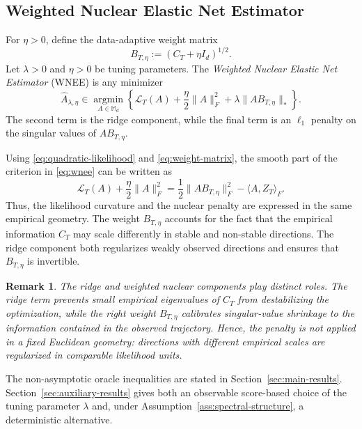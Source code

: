 \documentclass[11pt]{article}
\newtheorem{remark}[theorem]{Remark}
\begin{document}
\subsection{Weighted Nuclear Elastic Net Estimator}
\label{subsec:wnee}

For $\eta>0$, define the data-adaptive weight matrix
\begin{equation}
    B_{T,\eta}:=(C_T+\eta I_d)^{1/2}.
\label{eq:weight-matrix}
\end{equation}
Let $\lambda>0$ and $\eta>0$ be tuning parameters. The \emph{Weighted Nuclear
Elastic Net Estimator} (WNEE) is any minimizer
\begin{equation}
    \widehat A_{\lambda,\eta}
    \in\underset{A\in\mathbb M_d}{\operatorname{argmin}}
    \left\{
        \mathcal L_T(A)
        +\frac{\eta}{2}\|A\|_F^2
        +\lambda\big\|AB_{T,\eta}\big\|_*
    \right\}.
\label{eq:wnee}
\end{equation}
The second term is the ridge component, while the final term is an $\ell_1$
penalty on the singular values of $AB_{T,\eta}$.

Using \eqref{eq:quadratic-likelihood} and \eqref{eq:weight-matrix}, the smooth
part of the criterion in \eqref{eq:wnee} can be written as
\begin{equation}
    \mathcal L_T(A)+\frac{\eta}{2}\|A\|_F^2
    =\frac12\|AB_{T,\eta}\|_F^2-\langle A,Z_T\rangle_F.
\label{eq:weighted-geometry}
\end{equation}
Thus, the likelihood curvature and the nuclear penalty are expressed in the same
empirical geometry. The weight $B_{T,\eta}$ accounts for the fact that the
empirical information $C_T$ may scale differently in stable and non-stable
directions. The ridge component both regularizes weakly observed directions and
ensures that $B_{T,\eta}$ is invertible.

\begin{remark}
\label{rem:ridge-weight}
The ridge and weighted nuclear components play distinct roles. The ridge term
prevents small empirical eigenvalues of $C_T$ from destabilizing the optimization,
while the right weight $B_{T,\eta}$ calibrates singular-value shrinkage to the
information contained in the observed trajectory. Hence, the penalty is not
applied in a fixed Euclidean geometry: directions with different empirical scales
are regularized in comparable likelihood units.
\end{remark}

The non-asymptotic oracle inequalities are stated in
Section~\ref{sec:main-results}. Section~\ref{sec:auxiliary-results} gives both
an observable score-based choice of the tuning parameter $\lambda$ and, under
Assumption~\ref{ass:spectral-structure}, a deterministic alternative.
\end{document}
